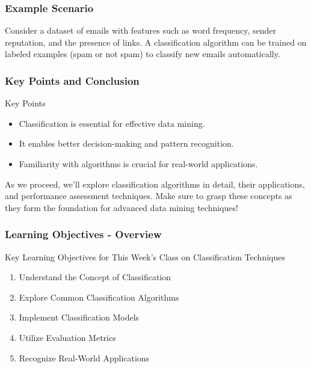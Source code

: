 \documentclass[aspectratio=169]{beamer}
\begin{document}
\begin{frame}[fragile]
    \frametitle{Example Scenario}
    Consider a dataset of emails with features such as word frequency, sender reputation, and the presence of links. A classification algorithm can be trained on labeled examples (spam or not spam) to classify new emails automatically.
\end{frame}

\begin{frame}[fragile]
    \frametitle{Key Points and Conclusion}
    \begin{block}{Key Points}
        \begin{itemize}
            \item Classification is essential for effective data mining.
            \item It enables better decision-making and pattern recognition.
            \item Familiarity with algorithms is crucial for real-world applications.
        \end{itemize}
    \end{block}
    
    As we proceed, we'll explore classification algorithms in detail, their applications, and performance assessment techniques. Make sure to grasp these concepts as they form the foundation for advanced data mining techniques!
\end{frame}

\begin{frame}[fragile]
    \frametitle{Learning Objectives - Overview}
    \begin{block}{Key Learning Objectives for This Week’s Class on Classification Techniques}
        \begin{enumerate}
            \item Understand the Concept of Classification
            \item Explore Common Classification Algorithms
            \item Implement Classification Models
            \item Utilize Evaluation Metrics
            \item Recognize Real-World Applications
        \end{enumerate}
    \end{block}
\end{frame}
\end{document}
